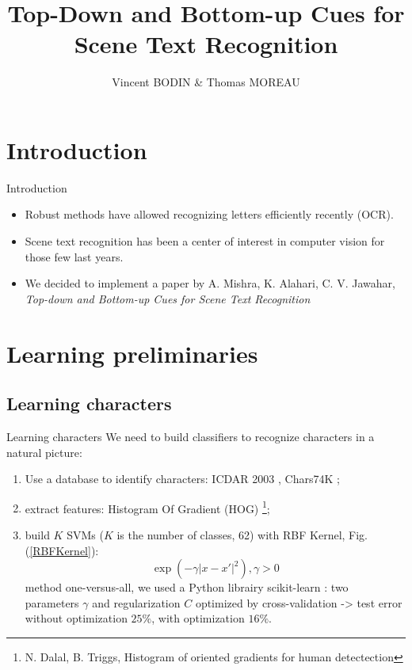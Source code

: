 \documentclass[handout]{beamer}
\title{\textbf{Top-Down and Bottom-up Cues for Scene Text Recognition}}
\author{Vincent BODIN \& Thomas MOREAU}
\begin{document}
\renewcommand{\contentsname}{Sommaire}


\begin{frame}[allowframebreaks]
\titlepage
\end{frame}


\section*{Introduction}


\begin{frame}{Introduction}
\begin{itemize}
	\item Robust methods have allowed recognizing letters efficiently recently (OCR).
	\item Scene text recognition has been a center of interest in computer vision for those few last years. 
	\item We decided to implement a paper by A. Mishra, K. Alahari, C. V. Jawahar, \emph{Top-down and Bottom-up Cues for Scene Text Recognition} \cite{Mis}
\end{itemize}
\end{frame}




\section{Learning preliminaries}

\subsection{Learning characters}

\begin{frame}{Learning characters}
We need to build classifiers to recognize characters in a natural picture:
\begin{enumerate}
	\item Use a database to identify characters: ICDAR 2003 \cite{ICDARchar}, Chars74K \cite{Char74K};
	
	\item extract features: Histogram Of Gradient (HOG) \cite{Dal2005}\footnote{N. Dalal, B. Triggs, Histogram of oriented gradients for human detectection};
	
	\item build $K$ SVMs ($K$ is the number of classes, 62) with RBF Kernel, Fig.(\ref{RBFKernel}):
	\begin{equation}
	\exp(-\gamma |x-x'|^2), \gamma > 0
	\label{eq:}
	\end{equation}
	method one-versus-all, we used a Python librairy scikit-learn \cite{scikit}: two parameters $\gamma$ and regularization $C$ optimized by cross-validation -> test error without optimization $25\%$, with optimization $16\%$.
\end{enumerate}
\end{frame}
\end{document}
